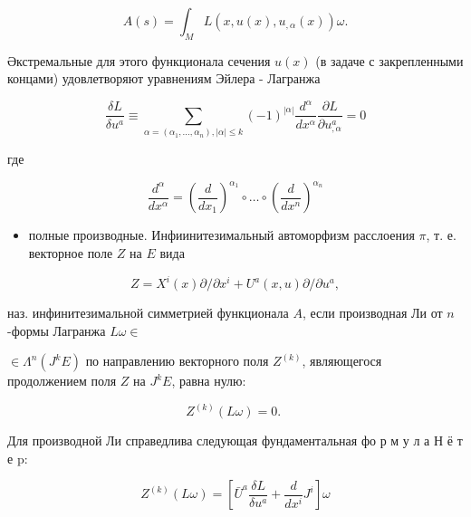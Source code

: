 \documentclass[10pt]{article}
\begin{document}
\[

A(s)=\int_{M} L\left(x, u(x), u_{, \alpha}(x)\right) \omega .

\]



Әкстремальные для этого функционала сечения $u(x)$ (в задаче с закрепленными концами) удовлетворяют уравнениям Эйлера - Лагранжа



\[

\frac{\delta L}{\delta u^{a}} \equiv \sum_{\alpha=\left(\alpha_{1}, \ldots, \alpha_{n}\right),|\alpha| \leqslant k}(-1)^{|\alpha|} \frac{d^{\alpha}}{d x^{\alpha}} \frac{\partial L}{\partial u_{, \alpha}^{a}}=0

\]



где



\[

\frac{d^{\alpha}}{d x^{\alpha}}=\left(\frac{d}{d x_{1}}\right)^{\alpha_{1}} \circ \ldots \circ\left(\frac{d}{d x^{n}}\right)^{\alpha_{n}}

\]



\begin{itemize}

  \item полные производные. Инфиинитезимальный автоморфизм расслоения $\pi$, т. е. векторное поле $Z$ на $E$ вида

\end{itemize}



\[

Z=X^{i}(x) \partial / \partial x^{i}+U^{a}(x, u) \partial / \partial u^{a},

\]



наз. инфинитезимальной симметрией функционала $A$, если производная Ли от $n$-формы Лагранжа $L \omega \in$

$\in \Lambda^{n}\left(J^{k} E\right)$ по направлению векторного поля $Z^{(k)}$, являющегося продолжением поля $Z$ на $J^{k} E$, равна нулю:



\[

Z^{(k)}(L \omega)=0 \text {. }

\]



Для производной Ли справедлива следующая фундаментальная фо р м у л а Н ё т е p:



\[

Z^{(k)}(L \omega)=\left[\bar{U}^{a} \frac{\delta L}{\delta u^{a}}+\frac{d}{d x^{i}} J^{i}\right] \omega

\]
\end{document}

